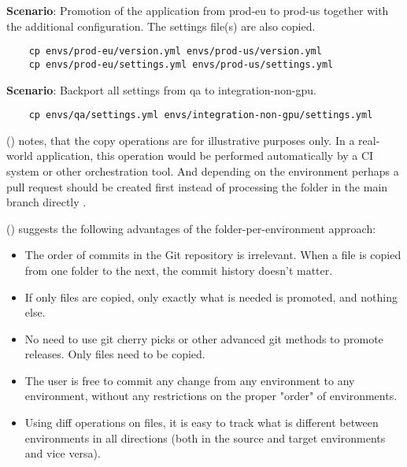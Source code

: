 \noindent
\textbf{Scenario}: Promotion of the application from prod-eu to prod-us together with the additional configuration. The settings file(s) are also copied.

\begin{verbatim}
	cp envs/prod-eu/version.yml envs/prod-us/version.yml
	cp envs/prod-eu/settings.yml envs/prod-us/settings.yml
\end{verbatim}

\noindent
\textbf{Scenario}: Backport all settings from qa to integration-non-gpu.

\begin{verbatim}
	cp envs/qa/settings.yml envs/integration-non-gpu/settings.yml
\end{verbatim}

\noindent
\citeauthor{codefreshHowToModelGitOpsEnvironmentsAndPromote} (\citeyear{codefreshHowToModelGitOpsEnvironmentsAndPromote})
notes,
that the copy operations are for illustrative purposes only. 
In a real-world application, this operation would be performed automatically by a CI system 
or other orchestration tool. And depending on the environment 
perhaps a pull request should be created first instead of processing the folder in the main branch directly
\autocite{codefreshHowToModelGitOpsEnvironmentsAndPromote}.
\bigskip

\noindent
\citeauthor{codefreshHowToModelGitOpsEnvironmentsAndPromote} (\citeyear{codefreshHowToModelGitOpsEnvironmentsAndPromote})
suggests the following advantages of the folder-per-environment approach:

\begin{itemize}
	\item The order of commits in the Git repository is irrelevant. When a file is copied from one folder to the next, the commit history doesn't matter.
	\item If only files are copied, only exactly what is needed is promoted, and nothing else.
	\item No need to use git cherry picks or other advanced git methods to promote releases. Only files need to be copied.
	\item The user is free to commit any change from any environment to any environment, without any restrictions on the proper "order" of environments.
	\item Using diff operations on files, it is easy to track what is different between environments in all directions (both in the source and target environments and vice versa).
\end{itemize}

\noindent
\autocite{codefreshHowToModelGitOpsEnvironmentsAndPromote}








